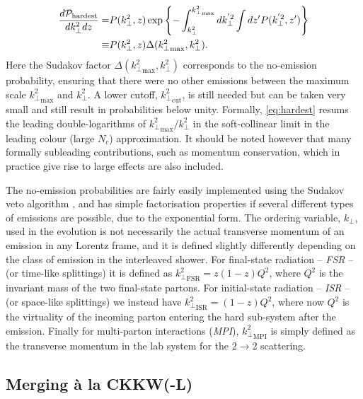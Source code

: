 \begin{align}
  \label{eq:hardest}
  \frac{d\mathcal{P}_{\mbox{\scriptsize hardest}}}{dk_\perp^2dz}=&
  P(k_\perp^2,z)
  \exp\left\{-\int_{k_\perp^2}^{{k^2_\perp}_{\max}}dk_\perp^{'2}
    \int dz' P(k_\perp^{'2}, z')\right\} \nonumber \\
    \equiv &
  P(k_\perp^2,z)\Delta({k^2_\perp}_{\max},k_\perp^2). 
\end{align}
Here the Sudakov factor  $\Delta({k^2_\perp}_{\max},k_\perp^2)$ corresponds to the no-emission probability,
ensuring that there
were no other emissions between the maximum scale ${k^2_\perp}_{\max}$ and $k_\perp^2$. 
A lower cutoff,
${k^2_\perp}_\mathrm{cut}$, is still needed but can be taken very small and
still result in probabilities below unity.
Formally, \cref{eq:hardest} resums the leading double-logarithms of ${k^2_\perp}_{\max}/k_\perp^2$
in the soft-collinear limit in the leading colour (large $N_c$) approximation. 
It should be noted however that many formally subleading contributions, such as momentum conservation,
which in practice give rise to large effects are also included.


The no-emission probabilities are fairly easily implemented using the
Sudakov veto algorithm \cite{Sjostrand:2006za}, and
has simple factorisation properties if several different types of
emissions are possible, due to the exponential form. The ordering variable, $k_\perp$, used 
in the evolution is not necessarily the actual transverse momentum of an emission in any
Lorentz frame, and it is defined slightly differently depending on the class of emission
in the interleaved shower. For final-state radiation -- \textit{FSR} -- (or time-like splittings) it is
defined as ${k^2_\perp}_\mathrm{FSR}=z(1-z)Q^2$, where $Q^2$
is the invariant mass of the two final-state partons. For initial-state radiation -- \textit{ISR} --
(or space-like splittings) we instead have ${k^2_\perp}_\mathrm{ISR}=(1-z)Q^2$, where now $Q^2$ is the virtuality of
the incoming parton entering the hard sub-system after the emission. Finally for
multi-parton interactions (\textit{MPI}), ${k^2_\perp}_\mathrm{MPI}$ is simply
defined as the transverse momentum in the lab system for the $2\to2$
scattering.

\subsection{Merging \`a la CKKW(-L)}
\label{sec:merging-a-la}

